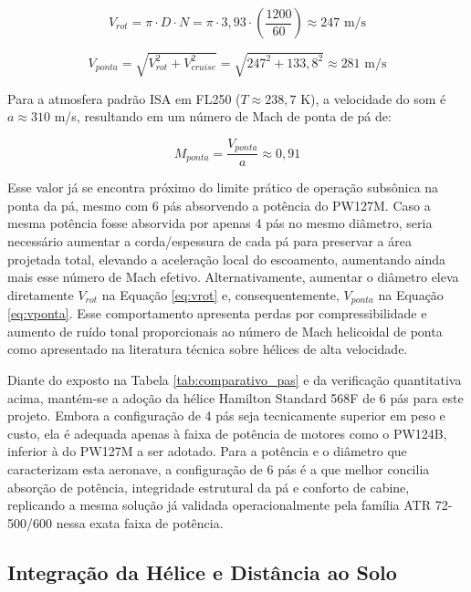 \begin{equation}
    V_{rot} = \pi \cdot D \cdot N = \pi \cdot 3{,}93 \cdot \left(\frac{1200}{60}\right) 
\approx 247 \text{ m/s}
    \label{eq:vrot}
\end{equation}

\begin{equation}
    V_{ponta} = \sqrt{V_{rot}^2 + V_{cruise}^2} = \sqrt{247^2 + 133{,}8^2} 
    \approx 281 \text{ m/s}
    \label{eq:vponta}
\end{equation}

Para a atmosfera padrão ISA em FL250 ($T \approx 238{,}7$ K), a velocidade do som é $a \approx 310$ m/s, resultando em um número de Mach de ponta de pá de:

\begin{equation}
    M_{ponta} = \frac{V_{ponta}}{a} \approx 0{,}91
    \label{eq:mach_ponta}
\end{equation}

Esse valor já se encontra próximo do limite prático de operação subsônica na ponta da pá, mesmo com 6 pás absorvendo a potência do PW127M. Caso a mesma potência fosse absorvida por apenas 4 pás no mesmo diâmetro, seria necessário aumentar a corda/espessura de cada pá para preservar a área projetada total, elevando a aceleração local do escoamento, aumentando ainda mais esse número de Mach efetivo. Alternativamente, aumentar o diâmetro eleva diretamente $V_{rot}$ na Equação \ref{eq:vrot} e, consequentemente, $V_{ponta}$ na Equação \ref{eq:vponta}. Esse comportamento apresenta perdas por compressibilidade e aumento de ruído tonal proporcionais ao número de Mach helicoidal de ponta como apresentado na literatura técnica sobre hélices de alta velocidade.

Diante do exposto na Tabela \ref{tab:comparativo_pas} e da verificação quantitativa acima, mantém-se a adoção da hélice Hamilton Standard 568F de 6 pás para este projeto. Embora a configuração de 4 pás seja tecnicamente superior em peso e custo, ela é adequada apenas à faixa de potência de motores como o PW124B, inferior à do PW127M a ser adotado. Para a potência e o diâmetro que caracterizam esta aeronave, a configuração de 6 pás é a que melhor concilia absorção de potência, integridade estrutural da pá e conforto de cabine, replicando a mesma solução já validada operacionalmente pela família ATR 72-500/600 nessa exata faixa de potência.

\subsection{Integração da Hélice e Distância ao Solo}
\label{sec:selecao_pas}

